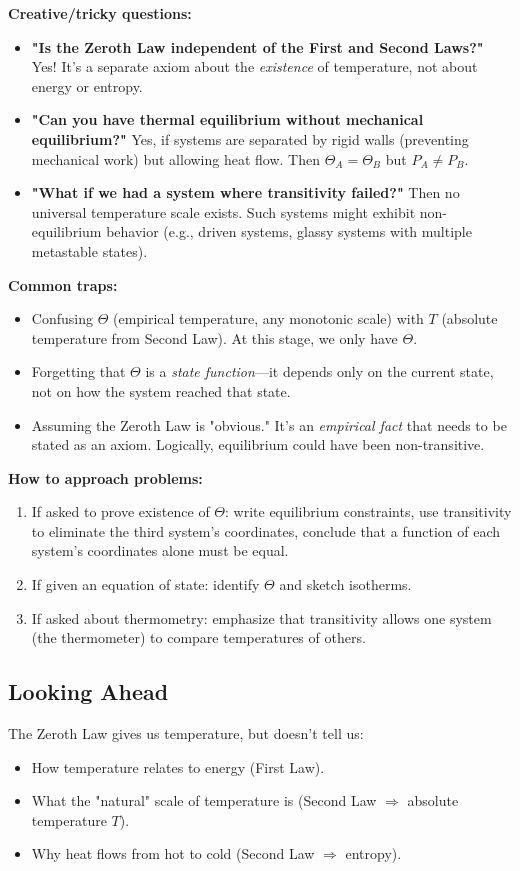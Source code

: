 \documentclass[9pt,twocoloumn]{article}
\begin{document}
\textbf{Creative/tricky questions:}
\begin{itemize}
    \item \textbf{"Is the Zeroth Law independent of the First and Second Laws?"} Yes! It's a separate axiom about the \emph{existence} of temperature, not about energy or entropy.
    \item \textbf{"Can you have thermal equilibrium without mechanical equilibrium?"} Yes, if systems are separated by rigid walls (preventing mechanical work) but allowing heat flow. Then $\Theta_A = \Theta_B$ but $P_A \neq P_B$.
    \item \textbf{"What if we had a system where transitivity failed?"} Then no universal temperature scale exists. Such systems might exhibit non-equilibrium behavior (e.g., driven systems, glassy systems with multiple metastable states).
\end{itemize}

\textbf{Common traps:}
\begin{itemize}
    \item Confusing $\Theta$ (empirical temperature, any monotonic scale) with $T$ (absolute temperature from Second Law). At this stage, we only have $\Theta$.
    \item Forgetting that $\Theta$ is a \emph{state function}—it depends only on the current state, not on how the system reached that state.
    \item Assuming the Zeroth Law is "obvious." It's an \emph{empirical fact} that needs to be stated as an axiom. Logically, equilibrium could have been non-transitive.
\end{itemize}

\textbf{How to approach problems:}
\begin{enumerate}
    \item If asked to prove existence of $\Theta$: write equilibrium constraints, use transitivity to eliminate the third system's coordinates, conclude that a function of each system's coordinates alone must be equal.
    \item If given an equation of state: identify $\Theta$ and sketch isotherms.
    \item If asked about thermometry: emphasize that transitivity allows one system (the thermometer) to compare temperatures of others.
\end{enumerate}

\subsection{Looking Ahead}
The Zeroth Law gives us temperature, but doesn't tell us:
\begin{itemize}
    \item How temperature relates to energy (First Law).
    \item What the "natural" scale of temperature is (Second Law $\Rightarrow$ absolute temperature $T$).
    \item Why heat flows from hot to cold (Second Law $\Rightarrow$ entropy).
\end{itemize}
\end{document}
